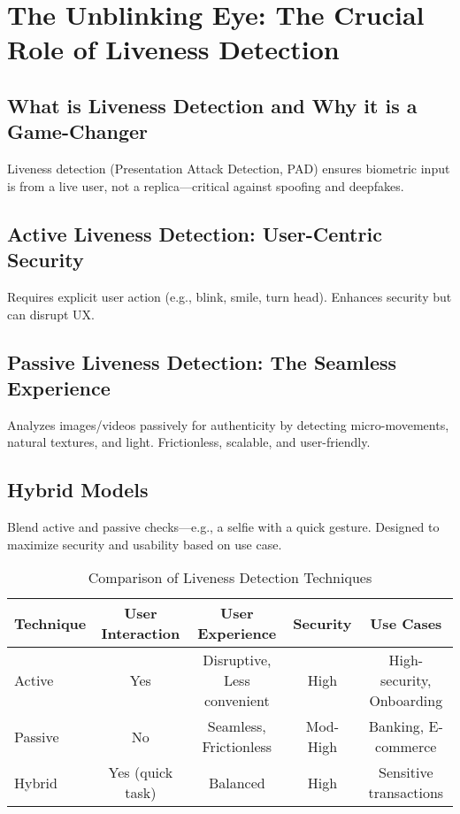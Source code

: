 \section{The Unblinking Eye: The Crucial Role of Liveness Detection}

\subsection{What is Liveness Detection and Why it is a Game-Changer}
Liveness detection (Presentation Attack Detection, PAD) ensures biometric input is from a live user, not a replica—critical against spoofing and deepfakes.

\subsection{Active Liveness Detection: User-Centric Security}
Requires explicit user action (e.g., blink, smile, turn head). Enhances security but can disrupt UX.

\subsection{Passive Liveness Detection: The Seamless Experience}
Analyzes images/videos passively for authenticity by detecting micro-movements, natural textures, and light. Frictionless, scalable, and user-friendly.

\subsection{Hybrid Models}
Blend active and passive checks—e.g., a selfie with a quick gesture. Designed to maximize security and usability based on use case.

\begin{table}[h]
\centering
\caption{Comparison of Liveness Detection Techniques}
\begin{tabular}{|l|c|c|c|c|}
\hline
\textbf{Technique} & \textbf{User Interaction} & \textbf{User Experience} & \textbf{Security} & \textbf{Use Cases} \\
\hline
Active & Yes & Disruptive, Less convenient & High & High-security, Onboarding \\
Passive & No & Seamless, Frictionless & Mod-High & Banking, E-commerce \\
Hybrid & Yes (quick task) & Balanced & High & Sensitive transactions \\
\hline
\end{tabular}
\end{table}

